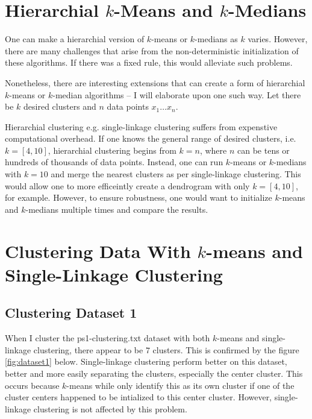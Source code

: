 \documentclass{article}
\begin{document}
\section[short]{Hierarchial $k$-Means and $k$-Medians}

        One can make a hierarchial version of $k$-means or $k$-medians as $k$ varies. However, there are many challenges that arise from the non-deterministic initialization of these algorithms. If there was a fixed rule, this would alleviate such problems.
        
        Nonetheless, there are interesting extensions that can create a form of hierarchial $k$-means or $k$-median algorithms -- I will elaborate upon one such way. Let there be $k$ desired clusters and $n$ data points $x_1 \ldots x_n$.

        Hierarchial clustering e.g. single-linkage clustering suffers from expenstive computational overhead. If one knows the general range of desired clusters, i.e. $k=[4,10]$, hierarchial clustering begins from $k=n$, where $n$ can be tens or hundreds of thousands of data points. Instead, one can run $k$-means or $k$-medians with $k=10$ and merge the nearest clusters as per single-linkage clustering. This would allow one to more efficeintly create a dendrogram with only $k=[4,10]$, for example. However, to ensure robustness, one would want to initialize $k$-means and $k$-medians multiple times and compare the results.

\section[short]{Clustering Data With $k$-means and \\ Single-Linkage Clustering}

    \subsection[short]{Clustering Dataset 1}

        When I cluster the ps1-clustering.txt dataset with both $k$-means and single-linkage clustering, there appear to be $7$ clusters. This is confirmed by the figure \ref{fig:dataset1} below. Single-linkage clustering perform better on this dataset, better and more easily separating the clusters, especially the center cluster. This occurs because $k$-means while only identify this as its own cluster if one of the cluster centers happened to be intialized to this center cluster. However, single-linkage clustering is not affected by this problem.
\end{document}
